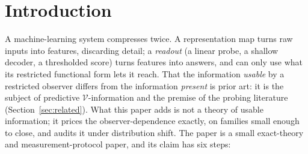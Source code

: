 \documentclass[twocolumn,10pt]{article}
\theoremstyle{definition}
\theoremstyle{remark}
\begin{document}
\section{Introduction}
\label{sec:intro}

A machine-learning system compresses twice. A representation map turns
raw inputs into features, discarding detail; a \emph{readout} (a
linear probe, a shallow decoder, a thresholded score) turns
features into answers, and can only use what its restricted functional
form lets it reach. That the information \emph{usable} by a restricted
observer differs from the information \emph{present} is prior art: it
is the subject of predictive $\mathcal{V}$-information \cite{xuvinfo}
and the premise of the probing literature
(Section~\ref{sec:related}). What this paper adds is not a theory of
usable information; it prices the observer-dependence exactly, on
families small enough to close, and audits it under distribution
shift. The paper is a small exact-theory and measurement-protocol
paper, and its claim has six steps:
\end{document}

